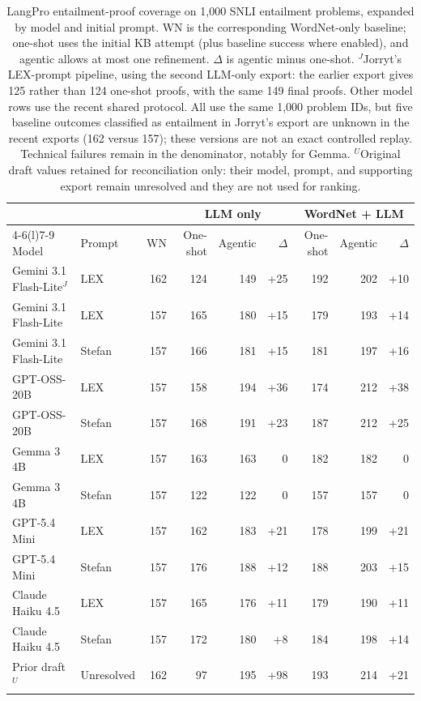 \begin{table}[t]
\centering
\small
\setlength{\tabcolsep}{4pt}
\begin{tabular}{@{}llrrrrrrr@{}}
\toprule
& & & \multicolumn{3}{c}{LLM only} & \multicolumn{3}{c}{WordNet + LLM} \\
\cmidrule(lr){4-6}\cmidrule(l){7-9}
Model & Prompt & WN & One-shot & Agentic & $\Delta$ & One-shot & Agentic & $\Delta$ \\
\midrule
Gemini 3.1 Flash-Lite$^{J}$ & LEX & 162 & 124 & 149 & +25 & 192 & 202 & +10 \\
\addlinespace[2pt]
Gemini 3.1 Flash-Lite & LEX & 157 & 165 & 180 & +15 & 179 & 193 & +14 \\
Gemini 3.1 Flash-Lite & Stefan & 157 & 166 & 181 & +15 & 181 & 197 & +16 \\
\addlinespace[2pt]
GPT-OSS-20B & LEX & 157 & 158 & 194 & +36 & 174 & 212 & +38 \\
GPT-OSS-20B & Stefan & 157 & 168 & 191 & +23 & 187 & 212 & +25 \\
\addlinespace[2pt]
Gemma 3 4B & LEX & 157 & 163 & 163 & 0 & 182 & 182 & 0 \\
Gemma 3 4B & Stefan & 157 & 122 & 122 & 0 & 157 & 157 & 0 \\
\addlinespace[2pt]
GPT-5.4 Mini & LEX & 157 & 162 & 183 & +21 & 178 & 199 & +21 \\
GPT-5.4 Mini & Stefan & 157 & 176 & 188 & +12 & 188 & 203 & +15 \\
\addlinespace[2pt]
Claude Haiku 4.5 & LEX & 157 & 165 & 176 & +11 & 179 & 190 & +11 \\
Claude Haiku 4.5 & Stefan & 157 & 172 & 180 & +8 & 184 & 198 & +14 \\
\midrule
Prior draft$^{U}$ & Unresolved & 162 & 97 & 195 & +98 & 193 & 214 & +21 \\
\bottomrule
\end{tabular}
\caption{LangPro entailment-proof coverage on 1,000 SNLI entailment problems,
expanded by model and initial prompt. WN is the corresponding WordNet-only
baseline; one-shot uses the initial KB attempt (plus baseline success where
enabled), and agentic allows at most one refinement. $\Delta$ is agentic
minus one-shot. $^{J}$Jorryt's LEX-prompt pipeline, using the second LLM-only
export: the earlier export gives 125 rather than 124 one-shot proofs, with
the same 149 final proofs. Other model rows use the recent shared protocol.
All use the same 1,000 problem IDs, but five baseline outcomes classified
as entailment in Jorryt's export are unknown in the recent exports
(162 versus 157); these versions are not an exact controlled replay.
Technical failures remain in the denominator, notably for Gemma.
$^{U}$Original draft values retained for reconciliation only: their
model, prompt, and supporting export remain unresolved and they are
not used for ranking.}
\label{tab:langpro-results}
\end{table}
